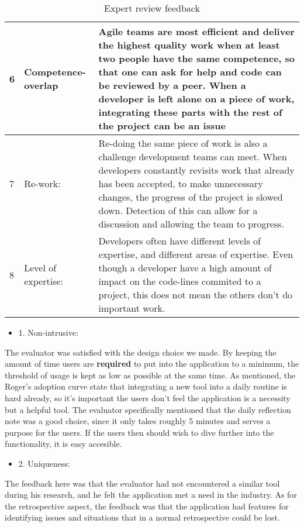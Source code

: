 \begin{table}[H]
\begin{tabularx}{\textwidth}{|l|l|X|}
    6  & Competence-overlap  & Agile teams are most efficient and deliver the highest quality work when at least two people have the same competence, so that one can ask for help and code can be reviewed by a peer. When a developer is left alone on a piece of work, integrating these parts with the rest of the project can be an issue                                                 \\ \hline
    7  & Re-work:            & Re-doing the same piece of work is also a challenge development teams can meet. When developers constantly revisits work that already has been accepted, to make unnecessary changes, the progress of the project is slowed down. Detection of this can allow for a discussion and allowing the team to progress.                                              \\ \hline
    8  & Level of expertise: & Developers often have different levels of expertise, and different areas of expertise. Even though a developer have a high amount of impact on the code-lines commited to a project, this does not mean the others don't do important work.                                                                                                                    \\ \hline
    \end{tabularx}
    \caption {Expert review feedback}
    \label{experttable}
\end{table}
\clearpage
\begin{itemize}
    \item 1. Non-intrusive:
\end{itemize}
The evaluator was satisfied with the design choice we made. By keeping the amount of time users are \textbf{required} to put into the application to a minimum, the threshold of usage is kept as low as possible at the same time. As mentioned, the Roger's adoption curve state that integrating a new tool into a daily routine is hard already, so it's important the users don't feel the application is a necessity but a helpful tool. The evaluator specifically mentioned that the daily reflection note was a good choice, since it only takes roughly 5 minutes and serves a purpose for the users. If the users then should wish to dive further into the functionality, it is easy accesible. 

\begin{itemize}
    \item 2. Uniqueness: 
\end{itemize}
The feedback here was that the evaluator had not encountered a similar tool during his research, and he felt the application met a need in the industry. As for the retrospective aspect, the feedback was that the application had features for identifying issues and situations that in a normal retrospective could be lost.  

